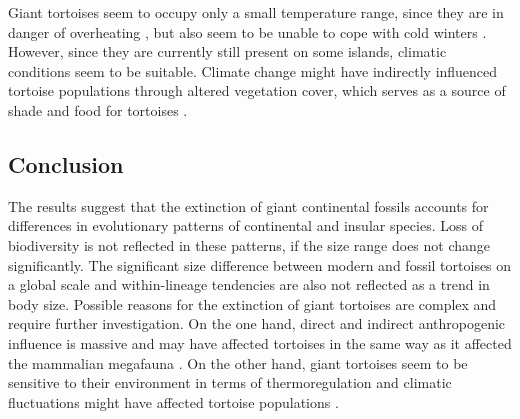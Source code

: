 Giant tortoises seem to occupy only a small temperature range, since they are in danger of overheating \citep{.}, but also seem to be unable to cope with cold winters \citep{Hibbard1960}. However, since they are currently still present on some islands, climatic conditions seem to be suitable. Climate change might have indirectly influenced tortoise populations through altered vegetation cover, which serves as a source of shade and food for tortoises \citep{Hunter2013, Cheke2016, Schleich1981}.








\subsection{Conclusion}
The results suggest that the extinction of giant continental fossils accounts for differences in evolutionary patterns of continental and insular species. Loss of biodiversity is not reflected in these patterns, if the size range does not change significantly.
The significant size difference between modern and fossil tortoises on a global scale and within-lineage tendencies are also not reflected as a trend in body size.
Possible reasons for the extinction of giant tortoises are complex and require further investigation. On the one hand, direct and indirect anthropogenic influence is massive and may have affected tortoises in the same way as it affected the mammalian megafauna \citep{Barnosky2004,Sandom2014}. On the other hand, giant tortoises seem to be sensitive to their environment in terms of thermoregulation and climatic fluctuations might have affected tortoise populations \citep{.}.


